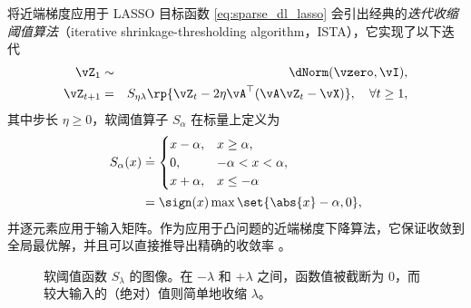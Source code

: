 \documentclass[../../book-main_zh.tex]{subfiles}
\begin{document}
将近端梯度应用于 LASSO 目标函数 \eqref{eq:sparse_dl_lasso}
会引出经典的\textit{迭代收缩阈值算法}（iterative shrinkage-thresholding
algorithm，ISTA），它实现了以下迭代
\begin{eqnarray}
    \vZ_{1} &\sim& \dNorm(\vzero, \vI), \\
    \vZ_{t + 1} &=& S_{\eta\lambda}\rp{\vZ_{t} - 2\eta
    \vA^{\top}(\vA\vZ_{t} - \vX)}, \quad \forall t \geq 1,\label{eq:ista_update}
\end{eqnarray}
其中步长 \(\eta \geq 0\)，软阈值算子 \(S_{\alpha}\) 在标量上定义为
\begin{align}
    S_{\alpha}(x) &
    \doteq
    \begin{cases}x - \alpha, & x \geq \alpha, \\ 0,
        & -\alpha < x < \alpha, \\ x + \alpha, & x \leq -\alpha
    \end{cases}
    \\
    &=
    \sign(x) \max \set{\abs{x} - \alpha, 0},
\end{align}
并逐元素应用于输入矩阵。作为应用于凸问题的近端梯度下降算法，它保证收敛到全局最优解，并且可以直接推导出精确的收敛率 \cite{Wright-Ma-2022}。

\begin{figure}
    \centering
    \caption{\small 软阈值函数 \(S_{\lambda}\) 的图像。在 \(-\lambda\) 和
    \(+\lambda\) 之间，函数值被截断为 \(0\)，而较大输入的（绝对）值则简单地收缩 \(\lambda\)。}
\end{figure}
\end{document}
